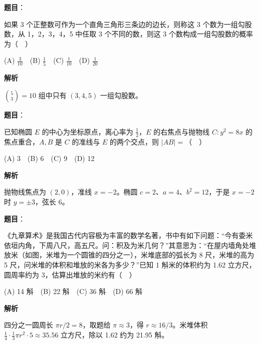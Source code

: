 \begin{answer}

\textbf{题目}：

如果 3 个正整数可作为一个直角三角形三条边的边长，则称这 3 个数为一组勾股数，从 1，2，3，4，5 中任取 3 个不同的数，则这 3 个数构成一组勾股数的概率为（　）

(A) $\frac3{10}$　(B) $\frac15$　(C) $\frac1{10}$　(D) $\frac1{20}$

\textbf{解析}

$\binom53=10$ 组中只有 $(3,4,5)$ 一组勾股数。


\end{answer}
\begin{answer}

\textbf{题目}：

已知椭圆 $E$ 的中心为坐标原点，离心率为 $\frac12$，$E$ 的右焦点与抛物线 $C:y^2=8x$ 的焦点重合，$A,B$ 是 $C$ 的准线与 $E$ 的两个交点，则 $|AB|=$（　）

(A) 3　(B) 6　(C) 9　(D) 12

\textbf{解析}

抛物线焦点为 $(2,0)$，准线 $x=-2$。椭圆 $c=2$、$a=4$、$b^2=12$，于是 $x=-2$ 时 $y=\pm3$，弦长 6。


\end{answer}
\begin{answer}

\textbf{题目}：

《九章算术》是我国古代内容极为丰富的数学名著，书中有如下问题：“今有委米依垣内角，下周八尺，高五尺。问：积及为米几何？”其意思为：“在屋内墙角处堆放米（如图，米堆为一个圆锥的四分之一），米堆底部的弧长为 8 尺，米堆的高为 5 尺，问米堆的体积和堆放的米各为多少？”已知 1 斛米的体积约为 1.62 立方尺，圆周率约为 3，估算出堆放的米约有（　）
\nopagebreak[4]
\begin{center}\end{center}
\nopagebreak[4]
(A) 14 斛　(B) 22 斛　(C) 36 斛　(D) 66 斛

\textbf{解析}

四分之一圆周长 $\pi r/2=8$，取题给 $\pi\approx3$，得 $r\approx16/3$。米堆体积 $\frac14\cdot\frac13\pi r^2\cdot5\approx35.56$ 立方尺，除以 1.62 约为 21.95 斛。


\end{answer}
